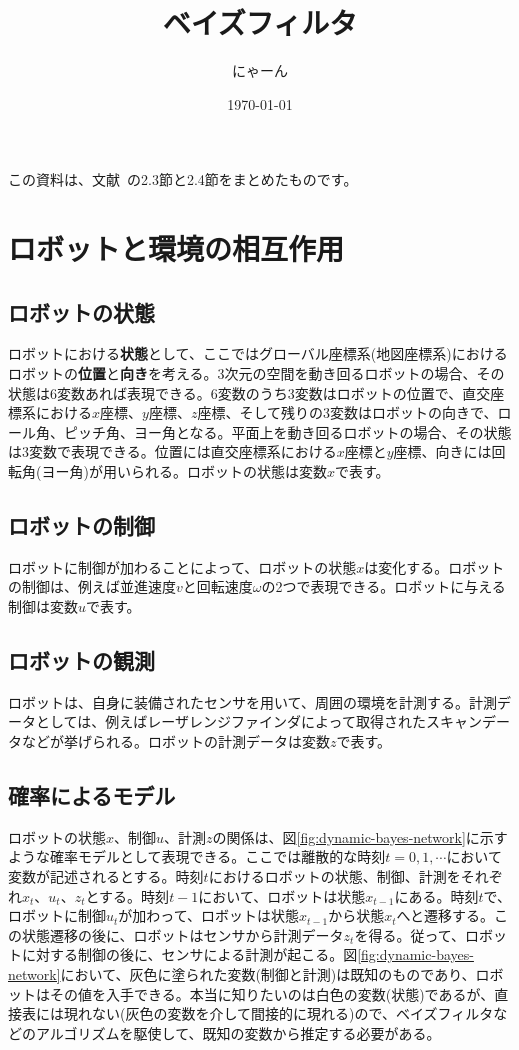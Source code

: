 \documentclass[dvipdfmx,a4paper]{jsarticle}
\title{ベイズフィルタ}
\author{にゃーん}
\date{\today}
\begin{document}
\maketitle

この資料は、文献~\cite{Thrun07}の2.3節と2.4節をまとめたものです。

\section{ロボットと環境の相互作用}
\subsection{ロボットの状態}
ロボットにおける\textbf{状態}として、ここではグローバル座標系(地図座標系)におけるロボットの\textbf{位置}と\textbf{向き}を考える。3次元の空間を動き回るロボットの場合、その状態は6変数あれば表現できる。6変数のうち3変数はロボットの位置で、直交座標系における$x$座標、$y$座標、$z$座標、そして残りの3変数はロボットの向きで、ロール角、ピッチ角、ヨー角となる。平面上を動き回るロボットの場合、その状態は3変数で表現できる。位置には直交座標系における$x$座標と$y$座標、向きには回転角(ヨー角)が用いられる。ロボットの状態は変数$x$で表す。

\subsection{ロボットの制御}
ロボットに制御が加わることによって、ロボットの状態$x$は変化する。ロボットの制御は、例えば並進速度$v$と回転速度$\omega$の2つで表現できる。ロボットに与える制御は変数$u$で表す。

\subsection{ロボットの観測}
ロボットは、自身に装備されたセンサを用いて、周囲の環境を計測する。計測データとしては、例えばレーザレンジファインダによって取得されたスキャンデータなどが挙げられる。ロボットの計測データは変数$z$で表す。

\subsection{確率によるモデル}
ロボットの状態$x$、制御$u$、計測$z$の関係は、図\ref{fig:dynamic-bayes-network}に示すような確率モデルとして表現できる。ここでは離散的な時刻$t = 0, 1, \cdots$において変数が記述されるとする。時刻$t$におけるロボットの状態、制御、計測をそれぞれ$x_t$、$u_t$、$z_t$とする。時刻$t - 1$において、ロボットは状態$x_{t - 1}$にある。時刻$t$で、ロボットに制御$u_t$が加わって、ロボットは状態$x_{t - 1}$から状態$x_t$へと遷移する。この状態遷移の後に、ロボットはセンサから計測データ$z_t$を得る。従って、ロボットに対する制御の後に、センサによる計測が起こる。図\ref{fig:dynamic-bayes-network}において、灰色に塗られた変数(制御と計測)は既知のものであり、ロボットはその値を入手できる。本当に知りたいのは白色の変数(状態)であるが、直接表には現れない(灰色の変数を介して間接的に現れる)ので、ベイズフィルタなどのアルゴリズムを駆使して、既知の変数から推定する必要がある。\newline
\end{document}
